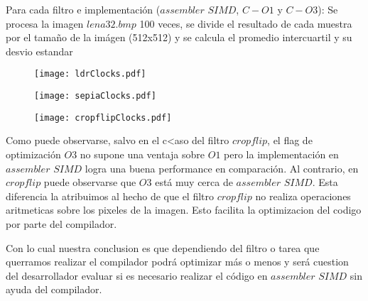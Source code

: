 Para cada filtro e implementación ($assembler$ $SIMD$, $C-O1$ y $C-O3$): Se procesa la imagen $lena32.bmp$ 100 veces, se divide el resultado de cada muestra por el tamaño de la imágen (512x512) y se calcula el promedio intercuartil y su desvio estandar

\begin{figure}[h]
  \begin{center}
	\texttt{[image: ldrClocks.pdf]}
  \end{center}
\end{figure}

\begin{figure}[h]
  \begin{center}
	\texttt{[image: sepiaClocks.pdf]}
  \end{center}
\end{figure}

\newpage

\begin{figure}
  \begin{center}
	\texttt{[image: cropflipClocks.pdf]}
  \end{center}
\end{figure}

Como puede observarse, salvo en el c<aso del filtro $cropflip$, el flag de optimización $O3$ no supone una ventaja sobre $O1$ pero la implementación en $assembler$ $SIMD$ logra una buena performance en comparación. Al contrario, en $cropflip$ puede observarse que $O3$ está muy cerca de $assembler$ $SIMD$. Esta diferencia la atribuimos al hecho de que el filtro $cropflip$ no realiza operaciones aritmeticas sobre los pixeles de la imagen. Esto facilita la optimizacion del codigo por parte del compilador. 

Con lo cual nuestra conclusion es que dependiendo del filtro o tarea que querramos realizar el compilador podrá optimizar más o menos y será cuestion del desarrollador evaluar si es necesario realizar el código en $assembler$ $SIMD$ sin ayuda del compilador. 

